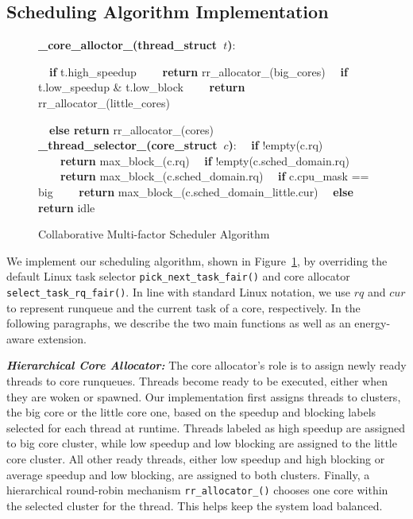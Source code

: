 \subsection{Scheduling Algorithm Implementation}
\begin{figure}[!t]
\label{alg:1}
\begin{algorithmic}[]
\STATE \textbf{\_core\_alloctor\_(thread\_struct\ $t$)}:

\STATE \ \ \textbf{if} t.high\_speedup
\STATE \ \ \ \ \textbf{return} rr\_allocator\_(big\_cores)
\STATE \ \ \textbf{if} {t.low\_speedup \& t.low\_block}
\STATE \ \ \ \ \textbf{return} rr\_allocator\_(little\_cores)

\STATE \ \ \textbf{else return} rr\_allocator\_(cores)
\STATE
\STATE \textbf{\_thread\_selector\_(core\_struct\ $c$)}:
\STATE \ \ \textbf{if}  !empty(c.rq)
\STATE \ \ \ \ \textbf{return} max\_block\_(c.rq)
\STATE \ \ \textbf{if} !empty(c.sched\_domain.rq)
\STATE \ \ \ \ \textbf{return} max\_block\_(c.sched\_domain.rq)
\STATE \ \ \textbf{if} c.cpu\_mask == big
\STATE \ \ \ \ \textbf{return}  max\_block\_(c.sched\_domain\_little.cur)
\STATE \ \ \textbf{else return} idle
\end{algorithmic}
\caption{Collaborative Multi-factor Scheduler Algorithm}
\end{figure}

\noindent
We implement our scheduling algorithm, shown in Figure~\ref{alg:1}, by overriding the default Linux task selector \texttt{pick\_next\_task\_fair()} and core allocator \texttt{select\_task\_rq\_fair()}.
In line with standard Linux notation, we use $rq$ and $cur$ to represent runqueue and the current task of a core, respectively. In the following paragraphs, we describe the two main functions as well as an energy-aware extension.

\textbf{\textit{Hierarchical Core Allocator:}}
The core allocator's role is to assign newly ready threads to core runqueues. Threads become ready to be executed, either when they are woken or spawned. Our implementation first assigns threads to clusters, the big core or the little core one, based on the speedup and blocking labels selected for each thread at runtime. Threads labeled as high speedup are assigned to big core cluster, while low speedup and low blocking are assigned to the little core cluster. All other ready threads, either low speedup and high blocking or average speedup and low blocking, are assigned to both clusters. Finally, a hierarchical round-robin mechanism \texttt{rr\_allocator\_()} chooses one core within the selected cluster for the thread. This helps keep the system load balanced. 

